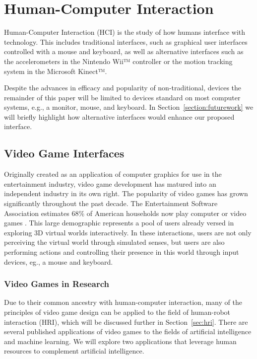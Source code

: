 \chapter{Human-Computer Interaction} %
\label{chapter:hci}
Human-Computer Interaction (HCI) is the study of how humans interface with technology. This includes traditional interfaces, such as graphical user interfaces controlled with a mouse and keyboard, as well as alternative interfaces such as the accelerometers in the Nintendo Wii™ controller or the motion tracking system in the Microsoft Kinect™.

Despite the advances in efficacy and popularity of non-traditional, devices the remainder of this paper will be limited to devices standard on most computer systems, e.g., a monitor, mouse, and keyboard. In Section~\ref{section:futurework} we will briefly highlight how alternative interfaces would enhance our proposed interface.

\section{Video Game Interfaces} %
\label{sec:video_game_interfaces}
Originally created as an application of computer graphics for use in the entertainment industry, video game development has matured into an independent industry in its own right. The popularity of video games has grown significantly throughout the past decade. The Entertainment Software Association estimates 68\% of American households now play computer or video games \cite{ESA}. This large demographic represents a pool of users already versed in exploring 3D virtual worlds interactively. In these interactions, users are not only perceiving the virtual world through simulated senses, but users are also performing actions and controlling their presence in this world through input devices, eg., a mouse and keyboard.

\subsection{Video Games in Research} %
\label{sub:video_games_in_research}
Due to their common ancestry with human-computer interaction, many of the principles of video game design can be applied to the field of human-robot interaction (HRI), which will be discussed further in Section~\ref{sec:hri}. There are several published applications of video games to the fields of artificial intelligence and machine learning. We will explore two applications that leverage human resources to complement artificial intelligence.

